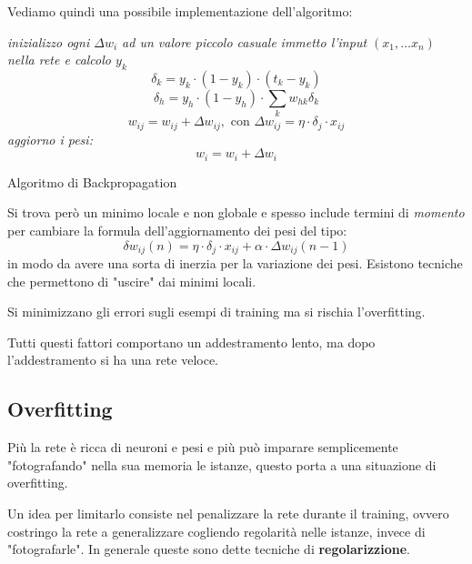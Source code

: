 Vediamo quindi una possibile implementazione dell'algoritmo:
\begin{algorithm}[H]
    \begin{algorithmic}
        \State \textit{inizializzo ogni $\Delta w_i$ ad un valore piccolo casuale}
        \State \textit{immetto l'input $( x_1, \ldots x_n)$ nella rete e calcolo
            $y_k$}
        \[\delta_k=y_k\cdot(1-y_k)\cdot(t_k-y_k)\]
        \EndFor
        \[\delta_h=y_h\cdot(1-y_h)\cdot\sum_k w_{hk}\delta_k\]
        \EndFor
        \[w_{ij}=w_{ij}+\Delta w_{ij},\mbox{ con } \Delta w_{ij}=\eta\cdot\delta_j\cdot x_{ij}\]
        \EndFor
        \EndFor
        \EndWhile
        \State \textit{aggiorno i pesi:}
        \[w_i=w_i+\Delta w_i\]
        \EndFunction
    \end{algorithmic}
    \caption{Algoritmo di Backpropagation}
\end{algorithm}

Si trova però un minimo locale e non globale e spesso include termini di \textit{momento}
per cambiare la formula dell'aggiornamento dei pesi del tipo:
\begin{equation}
    \delta w_{ij}(n) = \eta \cdot \delta_j \cdot x_{ij} + \alpha \cdot \Delta w_{ij} (n - 1)
\end{equation}
in modo da avere una sorta di inerzia per la variazione dei pesi. Esistono
tecniche che permettono di "uscire" dai minimi locali.

Si minimizzano gli errori sugli esempi di training ma si rischia l'overfitting.

Tutti questi fattori comportano un addestramento lento, ma dopo l'addestramento
si ha una rete veloce.
\subsection{Overfitting}
Più la rete è ricca di neuroni e pesi e più può imparare semplicemente "fotografando"
nella sua memoria le istanze, questo porta a una situazione di overfitting.

Un idea per limitarlo consiste nel penalizzare la rete durante il training, ovvero
costringo la rete a generalizzare cogliendo regolarità nelle istanze, invece di
"fotografarle". In generale queste sono dette tecniche di \textbf{regolarizzione}.

